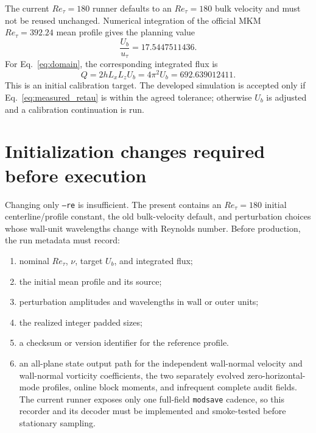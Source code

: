 \documentclass[11pt]{article}
\begin{document}
The current $Re_{\tau}=180$ runner defaults to an $Re_{\tau}=180$ bulk velocity and must
not be reused unchanged.  Numerical integration of the official MKM
$Re_{\tau}=392.24$ mean profile gives the planning value
\begin{equation}
  \frac{U_b}{u_{\tau}}=17.5447511436.
  \label{eq:bulk_velocity}
\end{equation}
For Eq.~\eqref{eq:domain}, the corresponding integrated flux is
\begin{equation}
  Q=2hL_xL_zU_b=4\pi^2 U_b=692.639012411.
  \label{eq:integrated_flux}
\end{equation}
This is an initial calibration target.  The developed simulation is accepted
only if Eq.~\eqref{eq:measured_retau} is within the agreed tolerance; otherwise
$U_b$ is adjusted and a calibration continuation is run.

\section{Initialization changes required before execution}

Changing only \texttt{--re} is insufficient.  The present
 contains an $Re_{\tau}=180$ initial centerline/profile constant,
the old bulk-velocity default, and perturbation choices whose wall-unit
wavelengths change with Reynolds number.  Before production, the run metadata
must record:
\begin{enumerate}
  \item nominal $Re_{\tau}$, $\nu$, target $U_b$, and integrated flux;
  \item the initial mean profile and its source;
  \item perturbation amplitudes and wavelengths in wall or outer units;
  \item the realized integer padded sizes;
  \item a checksum or version identifier for the reference profile.
  \item an all-plane state output path for the independent wall-normal
        velocity and wall-normal vorticity coefficients, the two separately
        evolved zero-horizontal-mode profiles, online block moments, and
        infrequent complete audit fields.  The current runner exposes only one
        full-field \texttt{modsave} cadence, so this recorder and its decoder
        must be implemented and smoke-tested before stationary sampling.
\end{enumerate}
\end{document}
